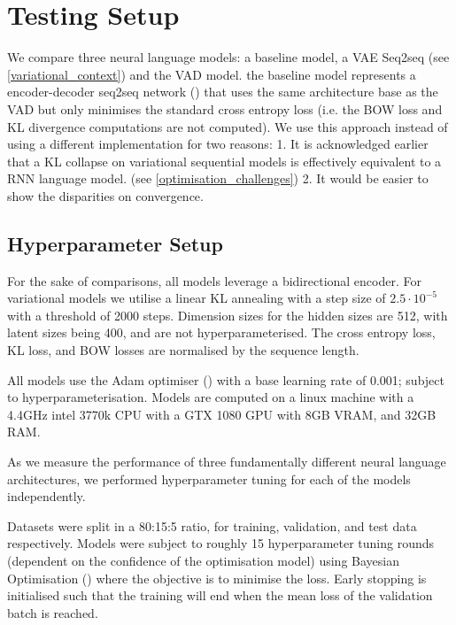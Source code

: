 \documentclass[12pt,twoside]{report}
\begin{document}

\section{Testing Setup}

We compare three neural language models: a baseline model, a VAE Seq2seq (see \ref{variational_context}) and the VAD model. the baseline model represents a encoder-decoder seq2seq network (\cite{serban_hierarchical_2016}) that uses the same architecture base as the VAD but only minimises the standard cross entropy loss (i.e. the BOW loss and KL divergence computations are not computed). We use this approach instead of using a different implementation for two reasons: 1. It is acknowledged earlier that a KL collapse on variational sequential models is effectively equivalent to a RNN language model. (see \ref{optimisation_challenges}) 2. It would be easier to show the disparities on convergence.

\subsection{Hyperparameter Setup}

For the sake of comparisons, all models leverage a bidirectional encoder. For variational models we utilise a linear KL annealing with a step size of $2.5\cdot 10^{-5}$ with a threshold of 2000 steps. Dimension sizes for the hidden sizes are 512, with latent sizes being 400, and are not hyperparameterised. The cross entropy loss, KL loss, and BOW losses are normalised by the sequence length. 

All models use the Adam optimiser (\cite{kingma_adam:_2014}) with a base learning rate of 0.001; subject to hyperparameterisation. Models are computed on a linux machine with a  4.4GHz intel 3770k CPU with a GTX 1080 GPU with 8GB VRAM, and 32GB RAM.

As we measure the performance of three fundamentally different neural language architectures, we performed hyperparameter tuning for each of the models independently.

Datasets were split in a 80:15:5 ratio, for training, validation, and test data respectively. Models were subject to roughly 15 hyperparameter tuning rounds (dependent on the confidence of the optimisation model) using Bayesian Optimisation (\cite{gpyopt_authors_gpyopt:_2016}) where the objective is to minimise the loss. Early stopping is initialised such that the training will end when the mean loss of the validation batch is reached. 
\end{document}
